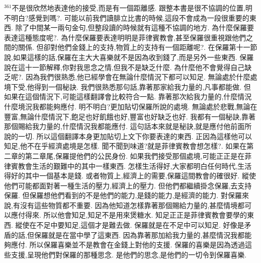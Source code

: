 \documentclass{book}
\begin{document}
$^{361}$不是很欣然地表達他的接受,而是有一個距離感.
跟整本書是很不協調的位置,明不明白?感覺到嗎?.
可能以前我們讀腓立比書的時候,這段不會成為一段很重要的東西.
除了中間某一兩句金句,但整段讀的時候就有這種不協調的地方.
為什麼保羅要表達這種態度呢?.
為什麼保羅要表達明明是菲律賓教會,甚至保羅很重視跟他們之間的關係.
但卻對他們金錢上的支持,物質上的支持有一個距離呢?.
在保羅第十一節說,如果這樣的話,保羅在主大大喜樂就不是因為收到錢了,而是另外一些東西.
保羅說在這十一節解釋,你對我思念之情,但我不是缺乏什麼.
為什麼他不會覺得自己缺乏呢?.
因為我們很熟悉,他已經學會在無論什麼情況下都可以知足.
無論處於什麼處境下受,他得到一個秘訣.
我們很熟悉那句話,靠著那家給我力量的,凡事都能做.
但如果在這個情況下,可能這樣翻譯會比較符合一點.
靠著那次給我力量的,什麼情況什麼境況我都能夠應付.
明不明白?更加貼切保羅所說的處境.
無論處於悲戰,無論在豐富,無論什麼情況下,飽足也好飢餓也好,豐富也好缺乏也好.
我都有一個秘訣,靠著那個賜給我力量的,什麼情況我都能應付.
這句話本來就是秘訣,就是應付他前面所說的一切.
所以這個翻譯本身更加貼切上文下你要表達的東西.
正因為這樣他可以知足,他不在乎經濟處境是怎樣.
聞不聞到味道?就是菲律賓教會想怎樣?.
如果在第二章的第二章尾,保羅提他們的公民身份.
如果我們接受那個處境,可能正正是在菲律賓教會生活的艱難中的其中一樣東西.
怎樣生活得好,大家都明白任何時代,生活得好的其中一個基本是錢.
或者物質上,經濟上的需要,保羅這間教會的確很好.
縱使他們可能都面對著一種生活的壓力,經濟上的壓力.
但他們都繼續掛念保羅,去支持保羅.
但保羅想他們看到的不是他們的能力,是錢的能力,是經濟的能力.
對保羅來說,有沒有這些物質都不重要.
因為他知道怎樣靠著那個賜給力量的,甚麼情境都可以應付得來.
所以他會知足,知足不是用來煲糖水.
知足正正是菲律賓教會要學的東西.
縱使在不足中要知足,這個才是難去做.
保羅就是在不足中可以知足.
好像是矛盾的話,但保羅就是在當中學了這東西.
因為靠著那加給我力量的,甚麼情況我都能夠應付.
所以保羅喜樂並不是教會在金錢上對他的支援.
保羅的喜樂是因為透過這些支援,呈現他們對保羅的那種思念.
是他們的思念,是他們的一切令到保羅喜樂.
\end{document}
